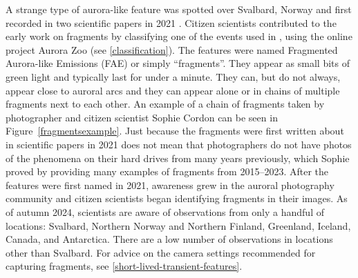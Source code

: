 \documentclass{article}
\renewcommand{\cite}[1]{\parencite{#1}}
\begin{document}
A strange type of aurora-like feature was spotted over Svalbard, Norway and first recorded in two scientific papers in 2021 \cite{Dreyer2021, Whiter2021}. Citizen scientists contributed to the early work on fragments by classifying one of the events used in \textcite{Whiter2021}, using the online project Aurora Zoo (see \ref{classification}). The features were named Fragmented Aurora-like Emissions (FAE) or simply ``fragments''. They appear as small bits of green light and typically last for under a minute. They can, but do not always, appear close to auroral arcs and they can appear alone or in chains of multiple fragments next to each other. An example of a chain of fragments taken by photographer and citizen scientist Sophie Cordon can be seen in Figure~\ref{fragmentsexample}. Just because the fragments were first written about in scientific papers in 2021 does not mean that photographers do not have photos of the phenomena on their hard drives from many years previously, which Sophie proved by providing many examples of fragments from 2015--2023.  After the features were first named in 2021, awareness grew in the auroral photography community and citizen scientists began identifying fragments in their images. As of autumn 2024, scientists are aware of observations from only a handful of locations: Svalbard, Northern Norway and Northern Finland, Greenland, Iceland, Canada, and Antarctica. There are a low number of observations in locations other than Svalbard. For advice on the camera settings recommended for capturing fragments, see \ref{short-lived-transient-features}.
\end{document}
